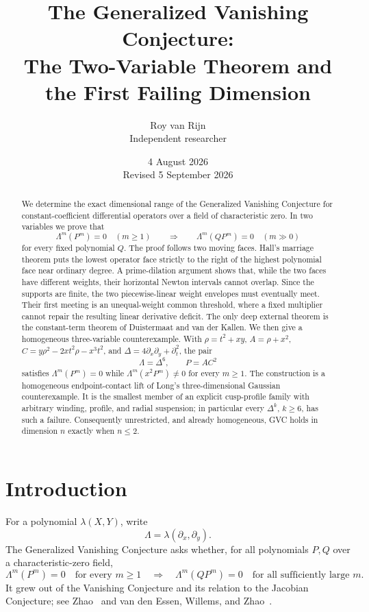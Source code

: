 \documentclass[11pt]{article}
\title{The Generalized Vanishing Conjecture:\\
The Two-Variable Theorem and the First Failing Dimension}
\author{Roy van Rijn\\{\small Independent researcher}}
\date{4 August 2026\\Revised 5 September 2026}
\begin{document}
\maketitle

\begin{abstract}
We determine the exact dimensional range of the Generalized Vanishing
Conjecture for constant-coefficient differential operators over a field of
characteristic zero.  In two variables we prove that
\[
 \Lambda^m(P^m)=0\quad(m\geq1)
 \qquad\Longrightarrow\qquad
 \Lambda^m(QP^m)=0\quad(m\gg0)
\]
for every fixed polynomial $Q$.  The proof follows two moving faces.  Hall's
marriage theorem puts the lowest operator face strictly to the right of the
highest polynomial face near ordinary degree.  A prime-dilation argument
shows that, while the two faces have different weights, their horizontal
Newton intervals cannot overlap.  Since the supports are finite, the two
piecewise-linear weight envelopes must eventually meet.  Their first meeting
is an unequal-weight common threshold, where a fixed multiplier cannot repair
the resulting linear derivative deficit.  The only deep external theorem is
the constant-term theorem of Duistermaat and van der Kallen.  We then give a
homogeneous
three-variable counterexample.  With
$\rho=t^2+xy$, $A=\rho+x^2$,
$C=y\rho^2-2xt^2\rho-x^3t^2$, and
$\Delta=4\partial_x\partial_y+\partial_t^2$, the pair
\[
 \Lambda=\Delta^6,\qquad P=AC^2
\]
satisfies $\Lambda^m(P^m)=0$ while
$\Lambda^m(x^2P^m)\ne0$ for every $m\geq1$.  The construction is a
homogeneous endpoint-contact lift of Long's three-dimensional Gaussian
counterexample.  It is the smallest member of an explicit cusp-profile
family with arbitrary winding, profile, and radial suspension; in
particular every $\Delta^k$, $k\geq6$, has such a failure.  Consequently
unrestricted, and already homogeneous, GVC holds in dimension $n$ exactly
when $n\leq2$.
\end{abstract}

\section{Introduction}

For a polynomial $\lambda(X,Y)$, write
\[
 \Lambda=\lambda(\partial_x,\partial_y).
\]
The Generalized Vanishing Conjecture asks whether, for all polynomials
$P,Q$ over a characteristic-zero field,
\begin{equation}\label{eq:gvc}
 \Lambda^m(P^m)=0\quad\text{for every }m\geq1
 \quad\Longrightarrow\quad
 \Lambda^m(QP^m)=0\quad\text{for all sufficiently large }m.
\end{equation}
It grew out of the Vanishing Conjecture and its relation to the Jacobian
Conjecture; see Zhao~\cite{Zhao} and van den Essen, Willems, and
Zhao~\cite{EWZ}.
\end{document}
